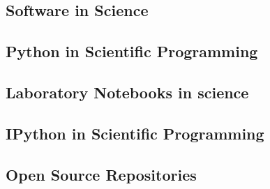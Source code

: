 \subsection{Software in Science}
\label{softwareSci}


\subsection{Python in Scientific Programming}
\label{python}


\subsection{Laboratory Notebooks in science}
\label{labBooks}


\subsection{IPython in Scientific Programming}
\label{IPython}



\subsection{Open Source Repositories}
\label{OSS}
